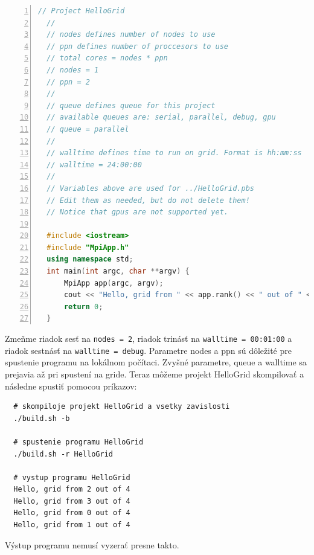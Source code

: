\begin{lstlisting}[language=c++, caption={HelloGrid/src/main.cpp}, numbers=left]
  // Project HelloGrid
  //
  // nodes defines number of nodes to use
  // ppn defines number of proccesors to use
  // total cores = nodes * ppn
  // nodes = 1
  // ppn = 2
  //
  // queue defines queue for this project
  // available queues are: serial, parallel, debug, gpu
  // queue = parallel
  //
  // walltime defines time to run on grid. Format is hh:mm:ss
  // walltime = 24:00:00
  //
  // Variables above are used for ../HelloGrid.pbs
  // Edit them as needed, but do not delete them!
  // Notice that gpus are not supported yet.
  
  #include <iostream>
  #include "MpiApp.h"
  using namespace std;
  int main(int argc, char **argv) {
      MpiApp app(argc, argv);
      cout << "Hello, grid from " << app.rank() << " out of " << app.size() << endl;
      return 0;
  }
\end{lstlisting}
Zmeňme riadok sesť na \texttt{nodes = 2}, riadok trinásť na \texttt{walltime = 00:01:00} a riadok sestnásť na \texttt{walltime = debug}.
Parametre nodes a ppn sú dôležité pre spustenie programu na lokálnom počítaci. Zvyšné parametre, queue a walltime sa prejavia až pri spustení na gride.
Teraz môžeme projekt HelloGrid skompilovať a následne spustiť pomocou príkazov:
\begin{lstlisting}
  # skompiloje projekt HelloGrid a vsetky zavislosti
  ./build.sh -b

  # spustenie programu HelloGrid
  ./build.sh -r HelloGrid

  # vystup programu HelloGrid
  Hello, grid from 2 out of 4
  Hello, grid from 3 out of 4
  Hello, grid from 0 out of 4
  Hello, grid from 1 out of 4
\end{lstlisting}
Výstup programu nemusí vyzerať presne takto.

